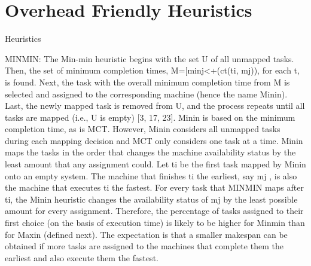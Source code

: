 \documentclass[final]{IEEEtran}
\begin{document}
\section{Overhead Friendly Heuristics}


Heuristics


MINMIN: The Min-min heuristic begins with the set U of all unmapped tasks. Then, the set of minimum completion times, M=[minj<+(ct(ti, mj)), for each t, is found. Next, the task with the overall minimum completion time from M is selected and assigned to the corresponding machine (hence the name Minin). Last, the newly mapped task is removed from U, and the process repeats until all tasks are mapped (i.e., U is empty) [3, 17, 23]. Minin is based on the minimum completion time, as is MCT. However, Minin considers all unmapped tasks during each mapping decision and MCT only considers one task at a time.
Minin maps the tasks in the order that changes the machine availability status by the least amount that any assignment could. Let ti be the first task mapped by Minin onto an empty system. The machine that finishes ti the earliest, say mj , is also the machine that executes ti the fastest. For every task that MINMIN maps after ti, the Minin heuristic changes the availability status of mj by the least possible amount for every assignment. Therefore, the percentage of tasks assigned to their first choice (on the basis of execution time) is likely to be higher for Minmin than for Maxin (defined next). The expectation is that a smaller makespan can be obtained if more tasks are assigned to the machines that complete them the earliest and also execute them the fastest.
\end{document}
